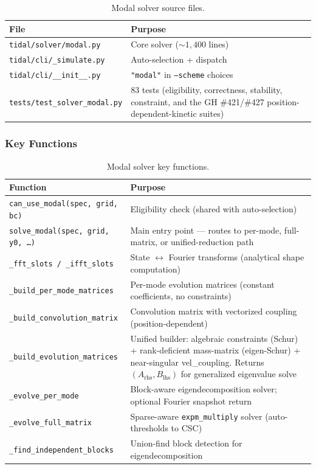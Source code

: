 \begin{table}[htbp]
\centering
\caption{Modal solver source files.}
\label{tab:modal-files}
\begin{tabular}{@{}ll@{}}
\toprule
File & Purpose \\
\midrule
\texttt{tidal/solver/modal.py} & Core solver (${\sim}1{,}400$ lines) \\
\texttt{tidal/cli/\_simulate.py} & Auto-selection + dispatch \\
\texttt{tidal/cli/\_\_init\_\_.py} & \texttt{"modal"} in \texttt{--scheme} choices \\
\texttt{tests/test\_solver\_modal.py} & 83 tests (eligibility, correctness, stability, constraint, and the GH \#421/\#427 position-dependent-kinetic suites) \\
\bottomrule
\end{tabular}
\end{table}

\subsubsection{Key Functions}
\label{sec:modal-key-functions}

\begin{table}[htbp]
\centering
\caption{Modal solver key functions.}
\label{tab:modal-functions}
\begin{tabular}{@{}ll@{}}
\toprule
Function & Purpose \\
\midrule
\texttt{can\_use\_modal(spec, grid, bc)} & Eligibility check (shared with auto-selection) \\
\texttt{solve\_modal(spec, grid, y0, \ldots)} & Main entry point --- routes to per-mode, full-matrix, or unified-reduction path \\
\texttt{\_fft\_slots / \_ifft\_slots} & State $\leftrightarrow$ Fourier transforms (analytical shape computation) \\
\texttt{\_build\_per\_mode\_matrices} & Per-mode evolution matrices (constant coefficients, no constraints) \\
\texttt{\_build\_convolution\_matrix} & Convolution matrix with vectorized coupling (position-dependent) \\
\texttt{\_build\_evolution\_matrices} & Unified builder: algebraic constraints (Schur) + rank-deficient mass-matrix (eigen-Schur) + near-singular vel\_coupling. Returns $(A_{\text{rhs}}, B_{\text{lhs}})$ for generalized eigenvalue solve \\
\texttt{\_evolve\_per\_mode} & Block-aware eigendecomposition solver; optional Fourier snapshot return \\
\texttt{\_evolve\_full\_matrix} & Sparse-aware \texttt{expm\_multiply} solver (auto-thresholds to CSC) \\
\texttt{\_find\_independent\_blocks} & Union-find block detection for eigendecomposition \\
\bottomrule
\end{tabular}
\end{table}

